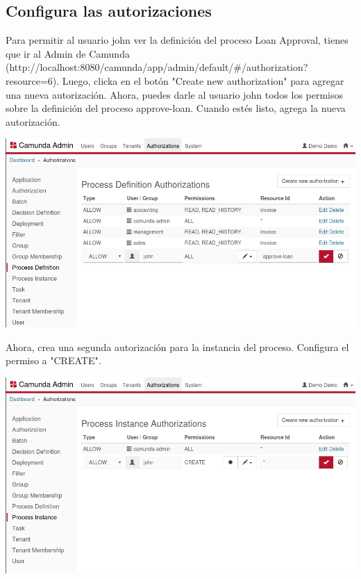\documentclass{article}
\begin{document}
\subsection{Configura las autorizaciones}

Para permitir al usuario john ver la definición del proceso Loan Approval, tienes que ir al Admin de Camunda (http://localhost:8080/camunda/app/admin/default/\#/authorization?resource=6). Luego, clicka en el botón "Create new authorization" para agregar una nueva autorización. Ahora, puedes darle al usuario john todos los permisos sobre la definición del proceso approve-loan. Cuando estés listo, agrega la nueva autorización.

\begin{center}
\includegraphics[width=\textwidth]{create-process-definition-authorization.png}
\end{center}

Ahora, crea una segunda autorización para la instancia del proceso. Configura el permiso a "CREATE".

\begin{center}
\includegraphics[width=\textwidth]{create-process-instance-authorization.png}
\end{center}
\end{document}
